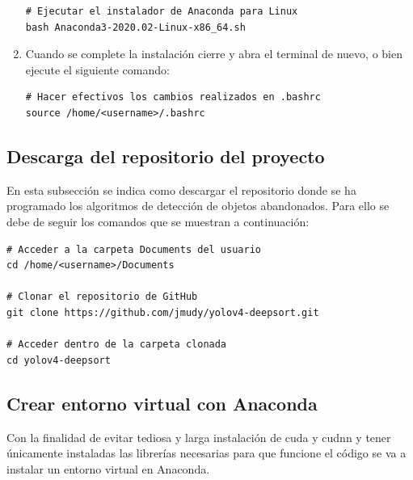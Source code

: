 \begin{enumerate}
\begin{lstlisting}[language=iPython,caption=Ejecutar el instalador de Anaconda para Linux,captionpos=b,label={lst:install-conda}]
# Ejecutar el instalador de Anaconda para Linux
bash Anaconda3-2020.02-Linux-x86_64.sh
\end{lstlisting}
    
    \item Cuando se complete la instalación cierre y abra el terminal de nuevo, o bien ejecute el siguiente comando:
    
    \vspace{0.5cm}
    
\begin{lstlisting}[language=iPython,caption=Hacer efectivo los cambios en el fichero .bashrc,captionpos=b,label={lst:source-bashrc}]
# Hacer efectivos los cambios realizados en .bashrc
source /home/<username>/.bashrc
\end{lstlisting}
\end{enumerate}

\subsection{Descarga del repositorio del proyecto}
\label{subsec:descarga-repo}

En esta subsección se indica como descargar el repositorio donde se ha programado los algoritmos de detección de objetos abandonados. Para ello se debe de seguir los comandos que se muestran a continuación:

\vspace{0.5cm}

\begin{lstlisting}[language=iPython,caption=Descarga repositorio,captionpos=b,label={lst:descarga-repo}]
# Acceder a la carpeta Documents del usuario
cd /home/<username>/Documents

# Clonar el repositorio de GitHub
git clone https://github.com/jmudy/yolov4-deepsort.git

# Acceder dentro de la carpeta clonada
cd yolov4-deepsort
\end{lstlisting}

\subsection{Crear entorno virtual con Anaconda}
\label{subsec:creacion-entorno}

Con la finalidad de evitar tediosa y larga instalación de \gls{cuda} y \gls{cudnn} y tener únicamente instaladas las librerías necesarias para que funcione el código se va a instalar un entorno virtual en Anaconda.

